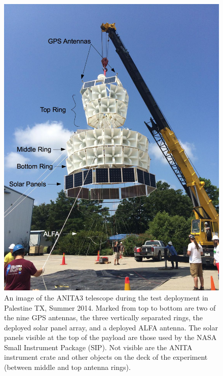 \begin{figure}
\centering
	\includegraphics[height=0.9\textheight]{figures/ANITA3_hangtest2_annotated}
	\caption{An image of the ANITA3 telescope during the test deployment in Palestine TX, Summer 2014.  Marked from top to bottom are two of the nine GPS antennas, the three vertically separated rings, the deployed solar panel array, and a deployed ALFA antenna.  The solar panels visible at the top of the payload are those used by the NASA Small Instrument Package (SIP).  Not visible are the ANITA instrument crate and other objects on the deck of the experiment (between middle and top antenna rings).}
	\label{fig:ANITA3_hangtest}
\end{figure}	
	
